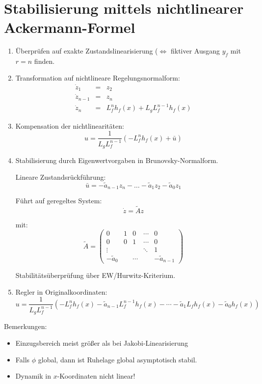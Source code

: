 \section{Stabilisierung mittels nichtlinearer Ackermann-Formel}
\begin{enumerate}
    \item
        Überprüfen auf exakte Zustandslinearisierung ($\Leftrightarrow$
        fiktiver Ausgang $y_f$ mit $r=n$ finden.
    \item
        Transformation auf nichtlineare Regelungsnormalform:
        \begin{eqnarray}
            \dot{z}_1 &=& z_2 \\
            \dot{z}_{n-1} &=& z_n \\
            \dot{z}_n &=& L_f^n h_f(x) + L_g L_f^{n-1} h_f(x)
        \end{eqnarray}
    \item
        Kompensation der nichtlinearitäten:
        \begin{equation}
            u = \frac{1}{L_g L_f^{n-1}} (-L_f^n h_f(x) + \bar{u})
        \end{equation}
    \item
        Stabilisierung durch Eigenwertvorgaben in Brunovsky-Normalform.
        
        Lineare Zustandsrückführung:
        \begin{equation}
            \bar{u} = -\tilde{a}_{n-1} z_n - \ldots - \tilde{a}_1 z_2 - \tilde{a}_0 z_1
        \end{equation}

        Führt auf geregeltes System:
        \begin{equation}
            \dot{z} = \tilde{A} z
        \end{equation}

        mit:
        \begin{equation}
            \tilde{A} =
                \begin{pmatrix}
                    0 & 1 & 0 & \cdots & 0 \\
                    0 & 0 & 1 & \cdots & 0 \\
                    \vdots & & & \ddots & 1 \\
                    -\tilde{a}_0 & & \cdots & & -\tilde{a}_{n-1}
                \end{pmatrix}
        \end{equation}

        Stabilitätsüberprüfung über EW/Hurwitz-Kriterium.
    \item
        Regler in Originalkoordinaten:
        \begin{equation}
            u = \frac{1}{L_g L_f^{n-1}} (-L_f^n h_f(x) 
            - \tilde{a}_{n-1} L_f^{n-1} h_f(x) - \cdots - \tilde{a}_1 L_f h_f(x)
            - \tilde{a}_0 h_f(x))
        \end{equation}
\end{enumerate}

Bemerkungen:
\begin{itemize}
    \item
        Einzugsbereich meist größer als bei Jakobi-Linearisierung
    \item
        Falls $\phi$ global, dann ist Ruhelage global asymptotisch stabil.
    \item 
        Dynamik in $x$-Koordinaten nicht linear!
\end{itemize}
